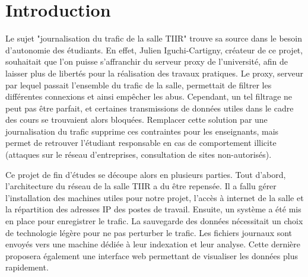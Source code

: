 \chapter*{Introduction}
\label{chap:introduction}

Le sujet "journalisation du trafic de la salle TIIR" trouve sa source dans le besoin d'autonomie des étudiants. En effet, Julien Iguchi-Cartigny, créateur de ce projet, souhaitait que l'on puisse s'affranchir du serveur proxy de l'université, afin de laisser plus de libertés pour la réalisation des travaux pratiques. Le proxy, serveur par lequel passait l'ensemble du trafic de la salle, permettait de filtrer les différentes connexions et ainsi empêcher les abus. Cependant, un tel filtrage ne peut pas être parfait, et certaines transmissions de données utiles dans le cadre des cours se trouvaient alors bloquées. Remplacer cette solution par une journalisation du trafic supprime ces contraintes pour les enseignants, mais permet de retrouver l'étudiant responsable en cas de comportement illicite (attaques sur le réseau d'entreprises, consultation de sites non-autorisés).

Ce projet de fin d'études se découpe alors en plusieurs parties. Tout d'abord, l'architecture du réseau de la salle TIIR a du être repensée. Il a fallu gérer l'installation des machines utiles pour notre projet, l'accès à internet de la salle et la répartition des adresses IP des postes de travail. Ensuite, un système a été mis en place pour enregistrer le trafic. La sauvegarde des données nécessitait un choix de technologie légère pour ne pas perturber le trafic. Les fichiers journaux sont envoyés vers une machine dédiée à leur indexation et leur analyse. Cette dernière proposera également une interface web permettant de visualiser les données plus rapidement.


